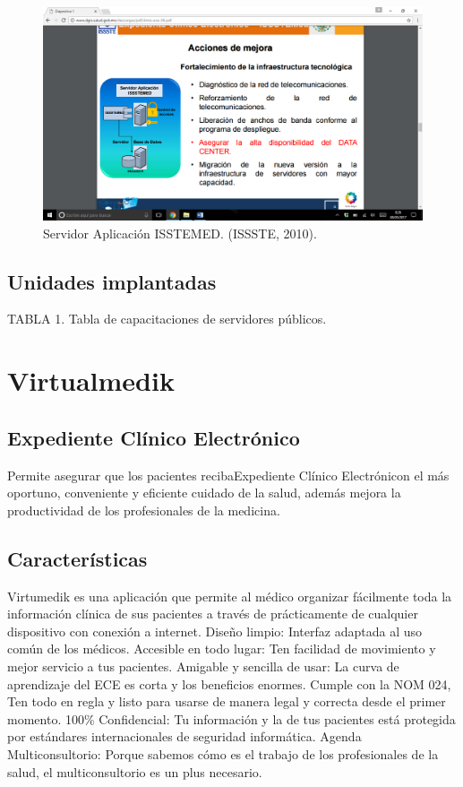\begin{figure}[h]
  \centering
  \label{figura1}
  \includegraphics[scale=.35]{lib/assets/1}
  \caption{Servidor Aplicación ISSTEMED. (ISSSTE, 2010).}
\end{figure}


 \subsection{Unidades implantadas}

TABLA 1. Tabla de capacitaciones de servidores públicos. \cite{ISSTE}



\section{Virtualmedik}

\subsection{Expediente Clínico Electrónico}
Permite asegurar que los pacientes recibaExpediente Clínico Electrónicon el más oportuno, conveniente y eficiente cuidado de la salud, además mejora la productividad de los profesionales de la medicina. \cite{Villareal}

\subsection{Características}
Virtumedik es una aplicación que permite al médico organizar fácilmente toda la información clínica de sus pacientes a través de prácticamente de cualquier dispositivo con conexión a internet.
Diseño limpio: Interfaz adaptada al uso común de los médicos.
Accesible en todo lugar: Ten facilidad de movimiento y mejor servicio a tus pacientes.
Amigable y sencilla de usar: La curva de aprendizaje del ECE es corta y los beneficios enormes.
Cumple con la NOM 024, Ten todo en regla y listo para usarse de manera legal y correcta desde el primer momento.
100\% Confidencial: Tu información y la de tus pacientes está protegida por estándares internacionales de seguridad informática.
Agenda Multiconsultorio: Porque sabemos cómo es el trabajo de los profesionales de la salud, el multiconsultorio es un plus necesario.\cite{Villareal}
